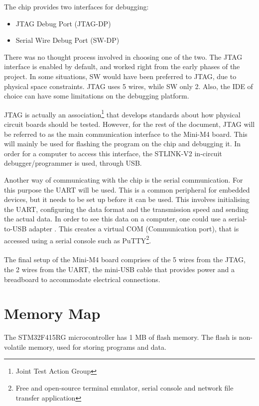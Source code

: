 The chip provides two interfaces for debugging:
\begin{itemize}[noitemsep]
	\item JTAG Debug Port (JTAG-DP)
	\item Serial Wire Debug Port (SW-DP)
\end{itemize}
There was no thought process involved in choosing one of the two.
The JTAG interface is enabled by default, and worked right from the
early phases of the project. In some situations, SW would have been
preferred to JTAG, due to physical space constraints. JTAG uses 5
wires, while SW only 2. Also, the IDE of choice can have some limitations 
on the debugging platform.

JTAG is actually an association\footnote{Joint Test Action Group} 
that develops standards about how 
physical circuit boards should be tested. However, for the rest of
the document, JTAG will be referred to as the main communication interface
to the Mini-M4 board. This will mainly be used for flashing the program
on the chip and debugging it. In order for a computer to access this
interface, the STLINK-V2 in-circuit debugger/programmer \cite{st_link}
is used, through USB.

Another way of communicating with the chip is the serial communication.
For this purpose the UART will be used. This is a common peripheral for 
embedded devices, but it needs to be set up before it can be used. This
involves initialising the UART, configuring the data format and the
transmission speed and sending the actual data. In order to see this data
on a computer, one could use a serial-to-USB adapter \cite{ttl_usb}.
This creates a virtual COM (Communication port), that is accessed using
a serial console such as PuTTY\footnote{Free and open-source terminal emulator, serial console and network file transfer application}.
\\\\
The final setup of the Mini-M4 board comprises of the 5 wires from the JTAG,
the 2 wires from the UART, the mini-USB cable that provides power and a
breadboard to accommodate electrical connections.

\section{Memory Map}
\label{sec:memory_map}
The STM32F415RG microcontroller has 1 MB of flash memory. The flash 
is non-volatile memory, used for storing programs and
data.

